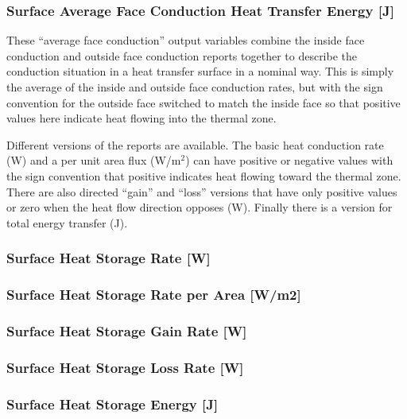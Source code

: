 \subsubsection{Surface Average Face Conduction Heat Transfer Energy {[}J{]}}\label{surface-average-face-conduction-heat-transfer-energy-j}

These ``average face conduction'' output variables combine the inside face conduction and outside face conduction reports together to describe the conduction situation in a heat transfer surface in a nominal way. This is simply the average of the inside and outside face conduction rates, but with the sign convention for the outside face switched to match the inside face so that positive values here indicate heat flowing into the thermal zone.

Different versions of the reports are available. The basic heat conduction rate (W) and a per unit area flux (W/m\(^{2}\)) can have positive or negative values with the sign convention that positive indicates heat flowing toward the thermal zone. There are also directed ``gain'' and ``loss'' versions that have only positive values or zero when the heat flow direction opposes (W). Finally there is a version for total energy transfer (J).

\subsubsection{Surface Heat Storage Rate {[}W{]}}\label{surface-heat-storage-rate-w}

\subsubsection{Surface Heat Storage Rate per Area {[}W/m2{]}}\label{surface-heat-storage-rate-per-area-wm2}

\subsubsection{Surface Heat Storage Gain Rate {[}W{]}}\label{surface-heat-storage-gain-rate-w}

\subsubsection{Surface Heat Storage Loss Rate {[}W{]}}\label{surface-heat-storage-loss-rate-w}

\subsubsection{Surface Heat Storage Energy {[}J{]}}\label{surface-heat-storage-energy-j}

